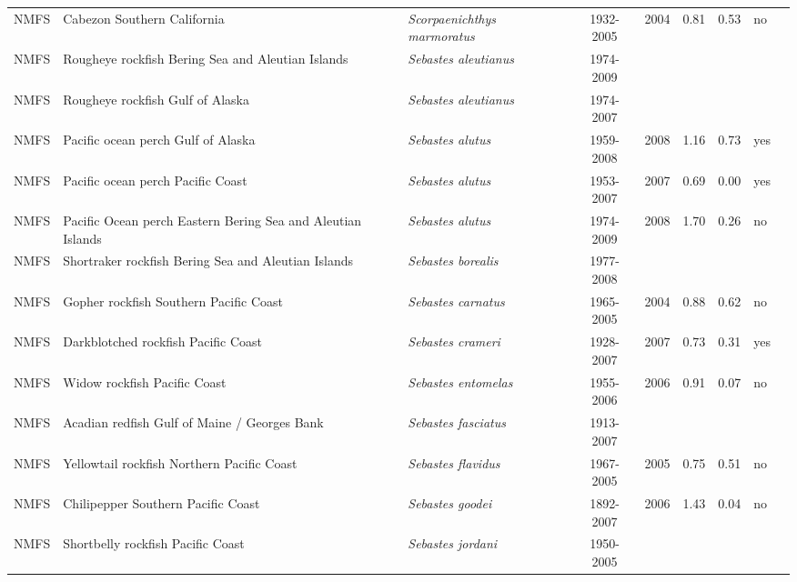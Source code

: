 \begin{longtable}{p{1.8cm}p{4cm}p{4cm}ccccp{1.9cm}c}
  NMFS & Cabezon Southern California & \textit{Scorpaenichthys marmoratus} & 1932-2005 & 2004 & 0.81 & 0.53 & no & \cite{2005_SAFE_Wccabezon.pdf} \\ 
  NMFS & Rougheye rockfish Bering Sea and Aleutian Islands & \textit{Sebastes aleutianus} & 1974-2009 &  &  &  &  & \cite{2008 SAFE BSAIrougheye.pdf} \\ 
  NMFS & Rougheye rockfish Gulf of Alaska & \textit{Sebastes aleutianus} & 1974-2007 &  &  &  &  & \cite{AFSC-RYEROCKGA-2008-Rougheye rockfish GA.pdf} \\ 
  NMFS & Pacific ocean perch Gulf of Alaska & \textit{Sebastes alutus} & 1959-2008 & 2008 & 1.16 & 0.73 & yes & \cite{AFSC-POPERCHGA-2008-Pacific ocean perch GA.pdf} \\ 
  NMFS & Pacific ocean perch Pacific Coast & \textit{Sebastes alutus} & 1953-2007 & 2007 & 0.69 & 0.00 & yes & \cite{NWFSC-POPERCHPCOAST-2007-Pacific ocean perch.pdf} \\ 
  NMFS & Pacific Ocean perch Eastern Bering Sea and Aleutian Islands & \textit{Sebastes alutus} & 1974-2009 & 2008 & 1.70 & 0.26 & no & \cite{2008_SAFE_BSAIpop.pdf} \\ 
  NMFS & Shortraker rockfish Bering Sea and Aleutian Islands & \textit{Sebastes borealis} & 1977-2008 &  &  &  &  & \cite{2008_SAFE_BSAIshortraker.pdf} \\ 
  NMFS & Gopher rockfish Southern Pacific Coast & \textit{Sebastes carnatus} & 1965-2005 & 2004 & 0.88 & 0.62 & no & \cite{2005-SAFE-Wcgopher.pdf} \\ 
  NMFS & Darkblotched rockfish Pacific Coast & \textit{Sebastes crameri} & 1928-2007 & 2007 & 0.73 & 0.31 & yes & \cite{NWFSC-DKROCKPCOAST-2008-Darkblotched rockfish.pdf} \\ 
  NMFS & Widow rockfish Pacific Coast & \textit{Sebastes entomelas} & 1955-2006 & 2006 & 0.91 & 0.07 & no & \cite{NWFSC-WROCKPCOAST-2007-widow.pdf} \\ 
  NMFS & Acadian redfish Gulf of Maine / Georges Bank & \textit{Sebastes fasciatus} & 1913-2007 &  &  &  &  & \cite{AcadianRedfish2008.pdf} \\ 
  NMFS & Yellowtail rockfish Northern Pacific Coast & \textit{Sebastes flavidus} & 1967-2005 & 2005 & 0.75 & 0.51 & no & \cite{2005_SAFE_yellowtail.pdf} \\ 
  NMFS & Chilipepper Southern Pacific Coast & \textit{Sebastes goodei} & 1892-2007 & 2006 & 1.43 & 0.04 & no & \cite{NWFSC-CHILISPCOAST-2007-Chilipepper CA OR.pdf} \\ 
  NMFS & Shortbelly rockfish Pacific Coast & \textit{Sebastes jordani} & 1950-2005 &  &  &  &  & \cite{SWFSC-SBELLYROCKPCOAST-2007-Shortbelly rockfish.pdf} \\ 

\end{longtable}
